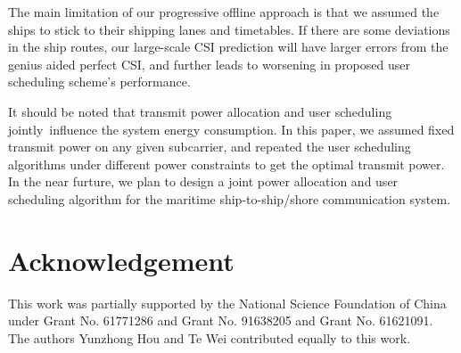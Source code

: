\documentclass[conference]{IEEEtran}
\begin{document}
 The main limitation of our progressive offline approach is that we assumed the ships to stick to their shipping lanes and timetables. If there are some deviations in the ship routes, our large-scale CSI prediction will have larger errors from the genius aided perfect CSI, and further leads to worsening in proposed user scheduling scheme's performance. 
 
 It should be noted that transmit power allocation and user scheduling jointly influence the system energy consumption. In this paper, we assumed fixed transmit power on any given subcarrier, and repeated the user scheduling algorithms under different power constraints to get the optimal transmit power. In the near furture, we plan to design a joint power allocation and user scheduling algorithm for the maritime ship-to-ship/shore communication system. 

 
 
 
 \section*{Acknowledgement}
 
 This work was partially supported by the National Science Foundation of China under Grant No. 61771286 and Grant No. 91638205 and Grant No. 61621091. The authors Yunzhong Hou and Te Wei contributed equally to this work.
 
\end{document}
